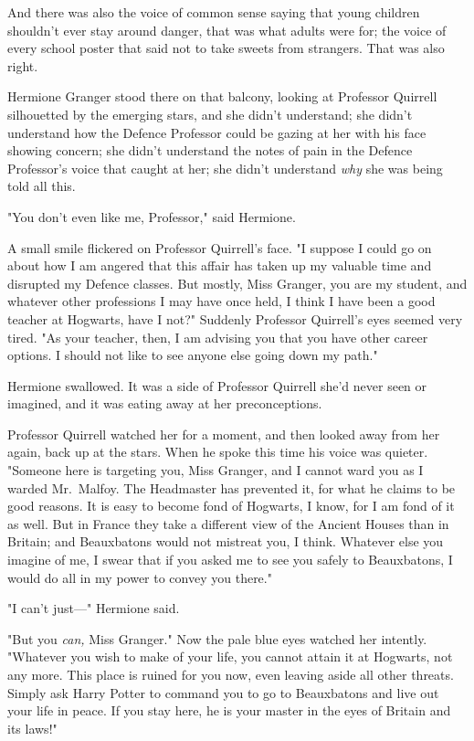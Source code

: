And there was also the voice of common sense saying that young children
shouldn't ever stay around danger, that was what adults were for; the voice of
every school poster that said not to take sweets from strangers. That was also
right.

Hermione Granger stood there on that balcony, looking at Professor Quirrell
silhouetted by the emerging stars, and she didn't understand; she didn't
understand how the Defence Professor could be gazing at her with his face
showing concern; she didn't understand the notes of pain in the Defence
Professor's voice that caught at her; she didn't understand \emph{why} she was
being told all this.

"You don't even like me, Professor," said Hermione.

A small smile flickered on Professor Quirrell's face. "I suppose I could go on
about how I am angered that this affair has taken up my valuable time and
disrupted my Defence classes. But mostly, Miss Granger, you are my student, and
whatever other professions I may have once held, I think I have been a good
teacher at Hogwarts, have I not?" Suddenly Professor Quirrell's eyes seemed
very tired. "As your teacher, then, I am advising you that you have other
career options. I should not like to see anyone else going down my path."

Hermione swallowed. It was a side of Professor Quirrell she'd never seen or
imagined, and it was eating away at her preconceptions.

Professor Quirrell watched her for a moment, and then looked away from her
again, back up at the stars. When he spoke this time his voice was quieter.
"Someone here is targeting you, Miss Granger, and I cannot ward you as I warded
Mr.~Malfoy. The Headmaster has prevented it, for what he claims to be good
reasons. It is easy to become fond of Hogwarts, I know, for I am fond of it as
well. But in France they take a different view of the Ancient Houses than in
Britain; and Beauxbatons would not mistreat you, I think. Whatever else you
imagine of me, I swear that if you asked me to see you safely to Beauxbatons, I
would do all in my power to convey you there."

"I can't just---" Hermione said.

"But you \emph{can,} Miss Granger." Now the pale blue eyes watched her
intently. "Whatever you wish to make of your life, you cannot attain it at
Hogwarts, not any more. This place is ruined for you now, even leaving aside all
other threats. Simply ask Harry Potter to command you to go to Beauxbatons and
live out your life in peace. If you stay here, he is your master in the eyes of
Britain and its laws!"

